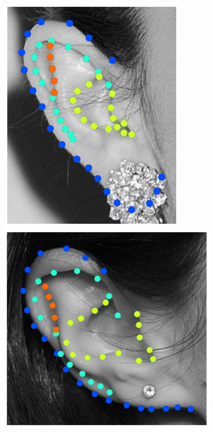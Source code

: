 \begin{figure}[!b]
    \includegraphics[height=\flowh]{resources/Ear_Deformable_Model/dbs/db_6}
    \\
    \includegraphics[height=\flowhhh]{resources/Ear_Deformable_Model/dbs/db_7}
    \hfill

\end{figure}
